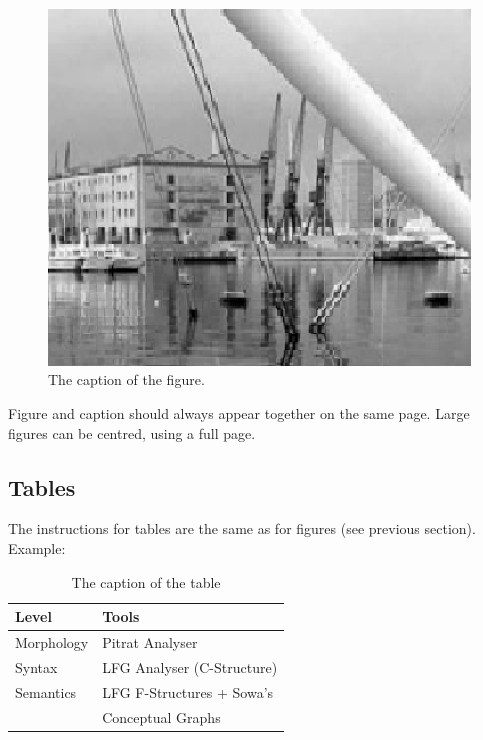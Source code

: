 \documentclass[10pt, a4paper]{article}
\begin{document}
\begin{figure}[h]
\begin{center}
\includegraphics[scale=0.5]{image1.eps} 
\caption{The caption of the figure.}
\label{fig.1}
\end{center}
\end{figure}

Figure and caption should always appear together on the same page. Large figures can be centred, using a full page.

\subsection{Tables}

The instructions for tables are the same as for figures (see previous section).
Example:
%
\begin{table}[h]
 \begin{center}
\begin{tabular}{|l|l|}

      \hline
      Level&Tools\\
      \hline\hline
      Morphology & Pitrat Analyser\\
      Syntax & LFG Analyser (C-Structure)\\
      Semantics & LFG F-Structures + Sowa's\\
      & Conceptual Graphs\\
      \hline

\end{tabular}
\caption{The caption of the table}
 \end{center}
\end{table}
\end{document}
